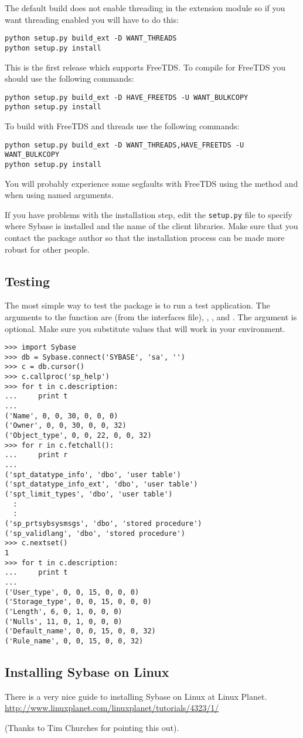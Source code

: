 The default build does not enable threading in the extension module so
if you want threading enabled you will have to do this:

\begin{verbatim}
python setup.py build_ext -D WANT_THREADS
python setup.py install
\end{verbatim}

This is the first release which supports FreeTDS.  To compile for
FreeTDS you should use the following commands:

\begin{verbatim}
python setup.py build_ext -D HAVE_FREETDS -U WANT_BULKCOPY
python setup.py install
\end{verbatim}

To build with FreeTDS and threads use the following commands:

\begin{verbatim}
python setup.py build_ext -D WANT_THREADS,HAVE_FREETDS -U WANT_BULKCOPY
python setup.py install
\end{verbatim}

You will probably experience some segfaults with FreeTDS using the
  method and when using named
arguments.

If you have problems with the installation step, edit the
\texttt{setup.py} file to specify where Sybase is installed and the
name of the client libraries.  Make sure that you contact the package
author so that the installation process can be made more robust for
other people.

\subsection{Testing}

The most simple way to test the  package is to run a
test application.  The arguments to the 
function are  (from the interfaces file), ,
, and .  The  argument is
optional.  Make sure you substitute values that will work in your
environment.

\begin{verbatim}
>>> import Sybase
>>> db = Sybase.connect('SYBASE', 'sa', '')
>>> c = db.cursor()
>>> c.callproc('sp_help')
>>> for t in c.description:
...     print t
... 
('Name', 0, 0, 30, 0, 0, 0)
('Owner', 0, 0, 30, 0, 0, 32)
('Object_type', 0, 0, 22, 0, 0, 32)
>>> for r in c.fetchall():
...     print r
... 
('spt_datatype_info', 'dbo', 'user table')
('spt_datatype_info_ext', 'dbo', 'user table')
('spt_limit_types', 'dbo', 'user table')
  :
  :
('sp_prtsybsysmsgs', 'dbo', 'stored procedure')
('sp_validlang', 'dbo', 'stored procedure')
>>> c.nextset()
1
>>> for t in c.description:
...     print t
... 
('User_type', 0, 0, 15, 0, 0, 0)
('Storage_type', 0, 0, 15, 0, 0, 0)
('Length', 6, 0, 1, 0, 0, 0)
('Nulls', 11, 0, 1, 0, 0, 0)
('Default_name', 0, 0, 15, 0, 0, 32)
('Rule_name', 0, 0, 15, 0, 0, 32)
\end{verbatim}

\subsection{Installing Sybase on Linux}

There is a very nice guide to installing Sybase on Linux at Linux
Planet.  \url{http://www.linuxplanet.com/linuxplanet/tutorials/4323/1/}

(Thanks to Tim Churches for pointing this out).
